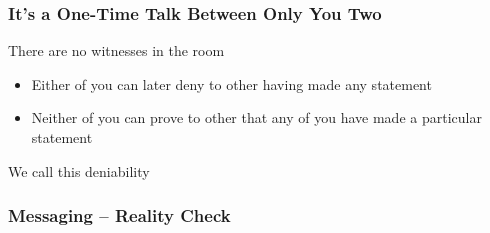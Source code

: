 \documentclass[
	aspectratio=169,
	xetex,
]{beamer}
\newcounter{i}
\begin{document}
\begin{frame}
	\frametitle{It's a One-Time Talk Between Only You Two}
	There are no witnesses in the room
	\begin{itemize}
		\item Either of you can later deny to other having made any statement
		\item Neither of you can prove to other that any of you have made a particular statement
	\end{itemize}
	We call this \alert{deniability}
\end{frame}


\begin{frame}
	\frametitle{Messaging -- Reality Check}
\end{frame}
\end{document}
